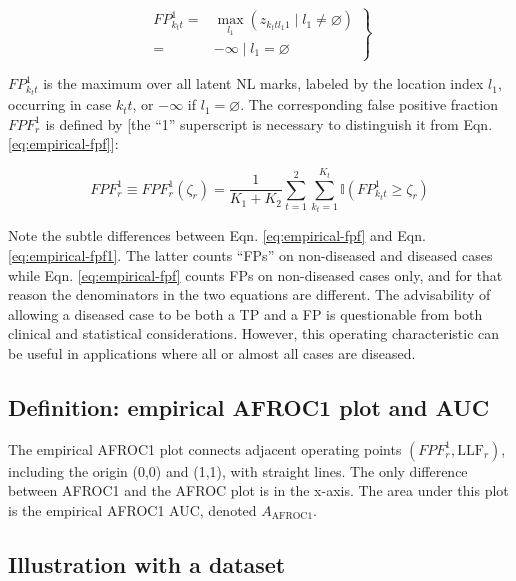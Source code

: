 \documentclass[
]{book}
\begin{document}
\begin{equation}
\left.
\begin{aligned}
FP_{k_t t}^1 =& \max_{l_1} \left ( z_{k_t t l_1 1 } \mid  l_1 \neq \varnothing \right )\\
=& -\infty \mid l_1 = \varnothing
\end{aligned}
\right \}
\label{eq:empirical-FP1}
\end{equation}

\(FP_{k_t t}^1\) is the maximum over all latent NL marks, labeled by the location index \(l_1\), occurring in case \(k_t t\), or \(-\infty\) if \(l_1 = \varnothing\). The corresponding false positive fraction \(FPF_r^1\) is defined by {[}the ``1'' superscript is necessary to distinguish it from Eqn. \eqref{eq:empirical-fpf}{]}:

\begin{equation}
FPF_r^1 \equiv FPF_r^1\left ( \zeta_r \right ) = \frac{1}{K_1+K_2}\sum_{t=1}^{2}\sum_{k_t=1}^{K_t} \mathbb{I}\left ( FP_{k_t t}^1 \geq \zeta_r \right )
\label{eq:empirical-fpf1}
\end{equation}

Note the subtle differences between Eqn. \eqref{eq:empirical-fpf} and Eqn. \eqref{eq:empirical-fpf1}. The latter counts ``FPs'' on non-diseased and diseased cases while Eqn. \eqref{eq:empirical-fpf} counts FPs on non-diseased cases only, and for that reason the denominators in the two equations are different. The advisability of allowing a diseased case to be both a TP and a FP is questionable from both clinical and statistical considerations. However, this operating characteristic can be useful in applications where all or almost all cases are diseased.

\hypertarget{empirical-definition-empirical-auc-afroc1}{%
\subsection{Definition: empirical AFROC1 plot and AUC}\label{empirical-definition-empirical-auc-afroc1}}

The empirical AFROC1 plot connects adjacent operating points \(\left ( FPF_r^1, \text{LLF}_r \right )\), including the origin (0,0) and (1,1), with straight lines. The only difference between AFROC1 and the AFROC plot is in the x-axis. The area under this plot is the empirical AFROC1 AUC, denoted \(A_{\text{AFROC1}}\).

\hypertarget{empirical-afroc1-plot-illustration}{%
\subsection{Illustration with a dataset}\label{empirical-afroc1-plot-illustration}}
\end{document}
